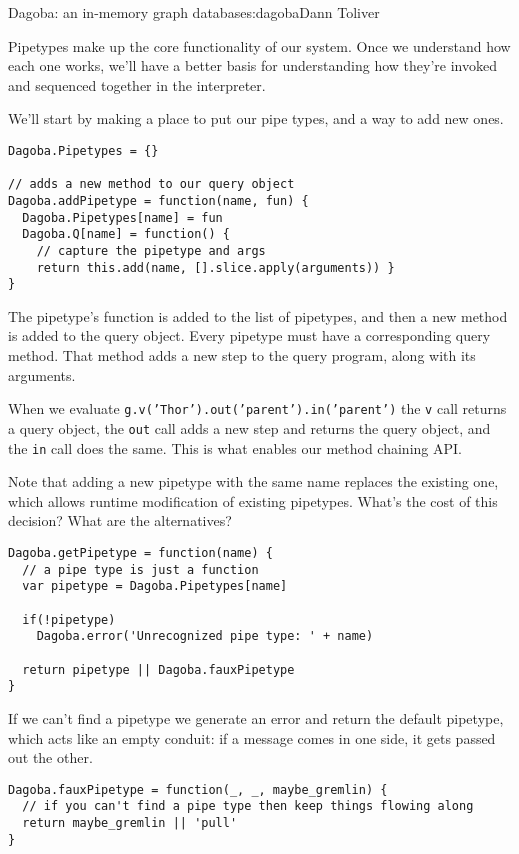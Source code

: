 \begin{aosachapter}{Dagoba: an in-memory graph database}{s:dagoba}{Dann Toliver}
\label{pipetypes}

Pipetypes make up the core functionality of our system. Once we
understand how each one works, we'll have a better basis for
understanding how they're invoked and sequenced together in the
interpreter.

We'll start by making a place to put our pipe types, and a way to add
new ones.

\begin{verbatim}
Dagoba.Pipetypes = {}                                   

// adds a new method to our query object
Dagoba.addPipetype = function(name, fun) {              
  Dagoba.Pipetypes[name] = fun
  Dagoba.Q[name] = function() {
    // capture the pipetype and args
    return this.add(name, [].slice.apply(arguments)) }  
}
\end{verbatim}

The pipetype's function is added to the list of pipetypes, and then a
new method is added to the query object. Every pipetype must have a
corresponding query method. That method adds a new step to the query
program, along with its arguments.

When we evaluate \texttt{g.v('Thor').out('parent').in('parent')} the
\texttt{v} call returns a query object, the \texttt{out} call adds a new
step and returns the query object, and the \texttt{in} call does the
same. This is what enables our method chaining API.

Note that adding a new pipetype with the same name replaces the existing
one, which allows runtime modification of existing pipetypes. What's the
cost of this decision? What are the alternatives?

\begin{verbatim}
Dagoba.getPipetype = function(name) {
  // a pipe type is just a function 
  var pipetype = Dagoba.Pipetypes[name]                 

  if(!pipetype)
    Dagoba.error('Unrecognized pipe type: ' + name)

  return pipetype || Dagoba.fauxPipetype
}
\end{verbatim}

If we can't find a pipetype we generate an error and return the default
pipetype, which acts like an empty conduit: if a message comes in one
side, it gets passed out the other.

\begin{verbatim}
Dagoba.fauxPipetype = function(_, _, maybe_gremlin) {   
  // if you can't find a pipe type then keep things flowing along
  return maybe_gremlin || 'pull'                        
}
\end{verbatim}


\end{aosachapter}
